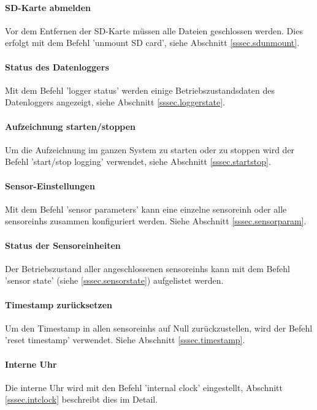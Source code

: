 \paragraph{SD-Karte abmelden} Vor dem Entfernen der SD-Karte müssen alle Dateien geschlossen werden. Dies erfolgt mit dem Befehl 'unmount SD card', siehe Abschnitt \ref{sssec.sdunmount}.

\paragraph{Status des Datenloggers} Mit dem Befehl 'logger status' werden einige Betriebszustandsdaten des Datenloggers angezeigt, siehe Abschnitt \ref{sssec.loggerstate}.

\paragraph{Aufzeichnung starten/stoppen} Um die Aufzeichnung im ganzen System zu starten oder zu stoppen wird der Befehl 'start/stop logging' verwendet, siehe Abschnitt \ref{sssec.startstop}.

\paragraph{Sensor-Einstellungen} Mit dem Befehl 'sensor parameters' kann eine einzelne \gls{sensoreinh} oder alle \glspl{sensoreinh} zusammen konfiguriert werden. Siehe Abschnitt \ref{sssec.sensorparam}.

\paragraph{Status der Sensoreinheiten} Der Betriebszustand aller angeschlossenen \glspl{sensoreinh} kann mit dem Befehl 'sensor state' (siehe \ref{sssec.sensorstate}) aufgelistet werden.

\paragraph{Timestamp zurücksetzen} Um den Timestamp in allen \glspl{sensoreinh} auf Null zurückzustellen, wird der Befehl 'reset timestamp' verwendet. Siehe Abschnitt \ref{sssec.timestamp}.

\paragraph{Interne Uhr} Die interne Uhr wird mit den Befehl 'internal clock' eingestellt, Abschnitt \ref{sssec.intclock} beschreibt dies im Detail.

